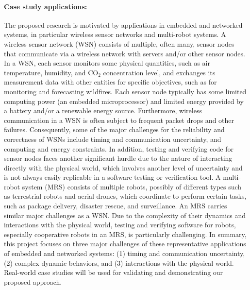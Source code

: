 \paragraph{Case study applications:}
\label{sec:field-applications}
The proposed research is motivated by applications in embedded and networked systems, in particular wireless sensor networks and multi-robot systems.
A wireless sensor network (WSN) consists of multiple, often many, sensor nodes that communicate via a wireless network with servers and/or other sensor nodes.
In a WSN, each sensor monitors some physical quantities, such as air temperature, humidity, and CO$_{2}$ concentration level, and exchanges its measurement data with other entities %
for specific objectives, such as for monitoring and forecasting wildfires.
Each sensor node typically has some limited computing power (an embedded microprocessor) and limited energy provided by a battery and/or a renewable energy source.
Furthermore, wireless communication in a WSN is often subject to frequent %
packet drops and other failures.
Consequently, some of the major challenges for the reliability and correctness of WSNs include timing and communication uncertainty, and computing and energy constraints.
In addition, testing and verifying  code for sensor nodes faces another significant hurdle due to the nature of interacting directly with the physical world, which involves another level of uncertainty and is not always easily replicable in a software testing or verification tool.
%
A multi-robot system (MRS) consists of multiple robots, possibly of different types such as terrestrial robots and aerial drones, which coordinate to perform certain tasks, such as package delivery, disaster rescue, and surveillance.
An MRS carries similar major challenges as a WSN.
Due to the complexity of their dynamics and interactions with the physical world, testing and verifying software for robots, especially cooperative robots in an MRS, is particularly challenging.
%
In summary, this project focuses on three %
major challenges of these representative applications %
of embedded and networked systems:
(1) timing and communication uncertainty,
(2) complex dynamic behaviors, and
(3) interactions with the physical world.
Real-world case studies will be used for validating and demonstrating our proposed approach.

